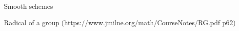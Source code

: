 %

\begin{definition}
  \label{smoothscheme}
  Smooth schemes
\end{definition}

\begin{definition}
  \label{radical}
  Radical of a group (https://www.jmilne.org/math/CourseNotes/RG.pdf p62)
\end{definition}


